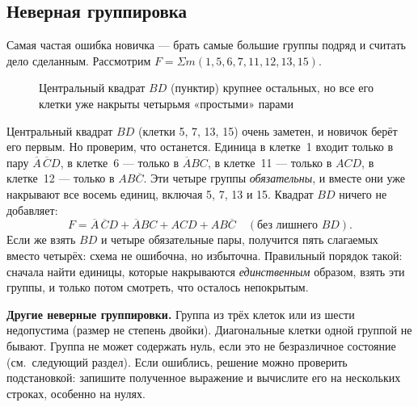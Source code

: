 \subsection{Неверная группировка}

Самая частая ошибка новичка --- брать самые большие группы подряд и считать
дело сделанным. Рассмотрим $F=\Sigma m(1,5,6,7,11,12,13,15)$.

\begin{figure}[H]
\centering
{}
\caption{Центральный квадрат $BD$ (пунктир) крупнее остальных, но все его клетки уже накрыты четырьмя «простыми» парами}
\label{fig:karnaugh4_wrong}
\end{figure}

Центральный квадрат $BD$ (клетки 5, 7, 13, 15) очень заметен, и новичок
берёт его первым. Но проверим, что останется. Единица в клетке~1 входит
только в пару $\overline{A}\,\overline{C}D$, в клетке~6 --- только в
$\overline{A}BC$, в клетке~11 --- только в $ACD$, в клетке~12 --- только в
$AB\overline{C}$. Эти четыре группы \emph{обязательны}, и вместе они уже
накрывают все восемь единиц, включая 5, 7, 13 и 15. Квадрат $BD$ ничего не
добавляет:
\[
  F=\overline{A}\,\overline{C}D+\overline{A}BC+ACD+AB\overline{C}\quad
  (\text{без лишнего }BD).
\]
Если же взять $BD$ и четыре обязательные пары, получится пять слагаемых
вместо четырёх: схема не ошибочна, но избыточна. Правильный порядок такой:
сначала найти единицы, которые накрываются \emph{единственным} образом, взять
эти группы, и только потом смотреть, что осталось непокрытым.

\textbf{Другие неверные группировки.} Группа из трёх клеток или из шести
недопустима (размер не степень двойки). Диагональные клетки одной группой
не бывают. Группа не может содержать нуль, если это не безразличное
состояние (см.~следующий раздел). Если ошиблись, решение можно проверить
подстановкой: запишите полученное выражение и вычислите его на нескольких
строках, особенно на нулях.

